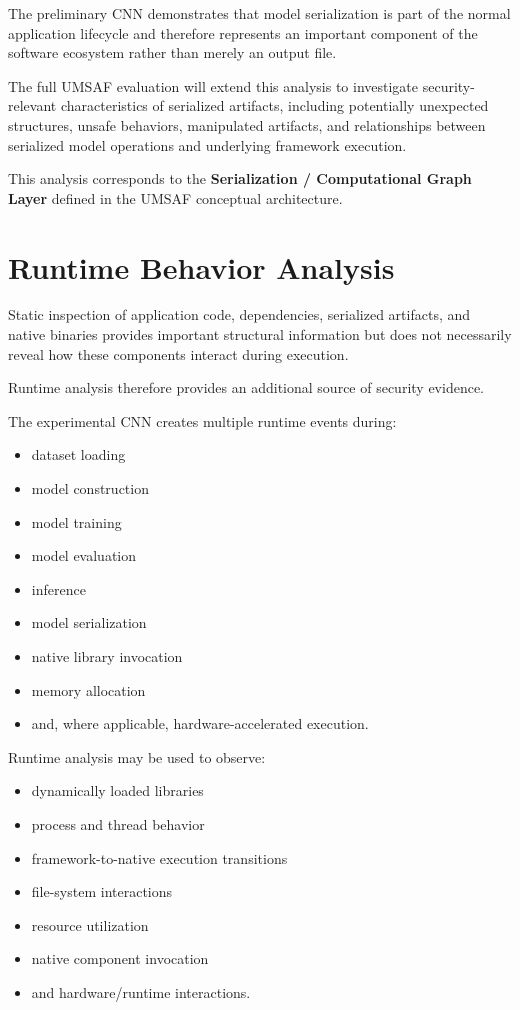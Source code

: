 \documentclass[
  12pt,
  letterpaper,
  oneside]{report}
\providecommand{\tightlist}{%
  \setlength{\itemsep}{0pt}\setlength{\parskip}{0pt}}
\begin{document}
The preliminary CNN demonstrates that model serialization is part of the
normal application lifecycle and therefore represents an important
component of the software ecosystem rather than merely an output file.

The full UMSAF evaluation will extend this analysis to investigate
security-relevant characteristics of serialized artifacts, including
potentially unexpected structures, unsafe behaviors, manipulated
artifacts, and relationships between serialized model operations and
underlying framework execution.

This analysis corresponds to the \textbf{Serialization / Computational
Graph Layer} defined in the UMSAF conceptual architecture.

\section{Runtime Behavior Analysis}\label{98-runtime-behavior-analysis}

Static inspection of application code, dependencies, serialized
artifacts, and native binaries provides important structural information
but does not necessarily reveal how these components interact during
execution.

Runtime analysis therefore provides an additional source of security
evidence.

The experimental CNN creates multiple runtime events during:

\begin{itemize}
\tightlist
\item
  dataset loading
\item
  model construction
\item
  model training
\item
  model evaluation
\item
  inference
\item
  model serialization
\item
  native library invocation
\item
  memory allocation
\item
  and, where applicable, hardware-accelerated execution.
\end{itemize}

Runtime analysis may be used to observe:

\begin{itemize}
\tightlist
\item
  dynamically loaded libraries
\item
  process and thread behavior
\item
  framework-to-native execution transitions
\item
  file-system interactions
\item
  resource utilization
\item
  native component invocation
\item
  and hardware/runtime interactions.
\end{itemize}
\end{document}
